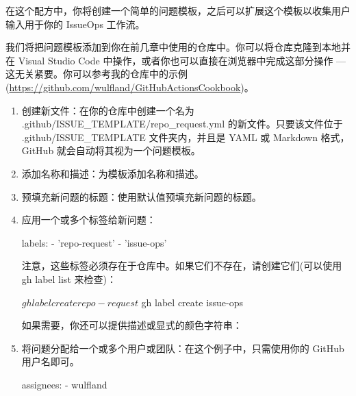在这个配方中，你将创建一个简单的问题模板，之后可以扩展这个模板以收集用户输入用于你的 IssueOps 工作流。


我们将把问题模板添加到你在前几章中使用的仓库中。你可以将仓库克隆到本地并在 Visual Studio Code 中操作，或者你也可以直接在浏览器中完成这部分操作 --- 这无关紧要。你可以参考我的仓库中的示例(\url{https://github.com/wulfland/GitHubActionsCookbook})。


\begin{enumerate}
\item 
创建新文件：在你的仓库中创建一个名为 .github/ISSUE\_TEMPLATE/repo\_request.yml 的新文件。只要该文件位于 .github/ISSUE\_TEMPLATE 文件夹内，并且是 YAML 或 Markdown 格式，GitHub 就会自动将其视为一个问题模板。

\item 
添加名称和描述：为模板添加名称和描述。


\item 
预填充新问题的标题：使用默认值预填充新问题的标题。


\item 
应用一个或多个标签给新问题：

\begin{shell}
labels:
  - 'repo-request'
  - 'issue-ops'
\end{shell}

注意，这些标签必须存在于仓库中。如果它们不存在，请创建它们(可以使用 gh label list 来检查)：

\begin{shell}
$ gh label create repo-request
$ gh label create issue-ops
\end{shell}

如果需要，你还可以提供描述或显式的颜色字符串：


\item 
将问题分配给一个或多个用户或团队：在这个例子中，只需使用你的 GitHub 用户名即可。

\begin{shell}
assignees:
  - wulfland
\end{shell}


\end{enumerate}
